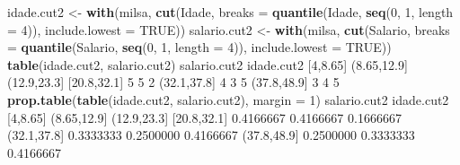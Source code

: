 \documentclass[10pt,a4paper]{book}
\newenvironment{Shaded}{\begin{snugshade}}{\end{snugshade}}
\newcommand{\KeywordTok}[1]{\textcolor[rgb]{0.13,0.29,0.53}{\textbf{#1}}}
\newcommand{\DataTypeTok}[1]{\textcolor[rgb]{0.13,0.29,0.53}{#1}}
\newcommand{\DecValTok}[1]{\textcolor[rgb]{0.00,0.00,0.81}{#1}}
\newcommand{\FloatTok}[1]{\textcolor[rgb]{0.00,0.00,0.81}{#1}}
\newcommand{\StringTok}[1]{\textcolor[rgb]{0.31,0.60,0.02}{#1}}
\newcommand{\OtherTok}[1]{\textcolor[rgb]{0.56,0.35,0.01}{#1}}
\newcommand{\NormalTok}[1]{#1}
\begin{document}
\begin{Shaded}
\begin{Highlighting}[]
\NormalTok{idade.cut2 <-}\StringTok{ }\KeywordTok{with}\NormalTok{(milsa, }\KeywordTok{cut}\NormalTok{(Idade,}
                              \DataTypeTok{breaks =} \KeywordTok{quantile}\NormalTok{(Idade, }\KeywordTok{seq}\NormalTok{(}\DecValTok{0}\NormalTok{, }\DecValTok{1}\NormalTok{, }\DataTypeTok{length =} \DecValTok{4}\NormalTok{)),}
                              \DataTypeTok{include.lowest =} \OtherTok{TRUE}\NormalTok{))}
\NormalTok{salario.cut2 <-}\StringTok{ }\KeywordTok{with}\NormalTok{(milsa, }\KeywordTok{cut}\NormalTok{(Salario,}
                                \DataTypeTok{breaks =} \KeywordTok{quantile}\NormalTok{(Salario, }\KeywordTok{seq}\NormalTok{(}\DecValTok{0}\NormalTok{, }\DecValTok{1}\NormalTok{, }\DataTypeTok{length =} \DecValTok{4}\NormalTok{)),}
                                \DataTypeTok{include.lowest =} \OtherTok{TRUE}\NormalTok{))}
\KeywordTok{table}\NormalTok{(idade.cut2, salario.cut2)}
\NormalTok{             salario.cut2}
\NormalTok{idade.cut2    [}\DecValTok{4}\NormalTok{,}\FloatTok{8.65}\NormalTok{] (}\FloatTok{8.65}\NormalTok{,}\FloatTok{12.9}\NormalTok{] (}\FloatTok{12.9}\NormalTok{,}\FloatTok{23.3}\NormalTok{]}
\NormalTok{  [}\FloatTok{20.8}\NormalTok{,}\FloatTok{32.1}\NormalTok{]        }\DecValTok{5}           \DecValTok{5}           \DecValTok{2}
\NormalTok{  (}\FloatTok{32.1}\NormalTok{,}\FloatTok{37.8}\NormalTok{]        }\DecValTok{4}           \DecValTok{3}           \DecValTok{5}
\NormalTok{  (}\FloatTok{37.8}\NormalTok{,}\FloatTok{48.9}\NormalTok{]        }\DecValTok{3}           \DecValTok{4}           \DecValTok{5}
\KeywordTok{prop.table}\NormalTok{(}\KeywordTok{table}\NormalTok{(idade.cut2, salario.cut2), }\DataTypeTok{margin =} \DecValTok{1}\NormalTok{)}
\NormalTok{             salario.cut2}
\NormalTok{idade.cut2     [}\DecValTok{4}\NormalTok{,}\FloatTok{8.65}\NormalTok{] (}\FloatTok{8.65}\NormalTok{,}\FloatTok{12.9}\NormalTok{] (}\FloatTok{12.9}\NormalTok{,}\FloatTok{23.3}\NormalTok{]}
\NormalTok{  [}\FloatTok{20.8}\NormalTok{,}\FloatTok{32.1}\NormalTok{] }\FloatTok{0.4166667}   \FloatTok{0.4166667}   \FloatTok{0.1666667}
\NormalTok{  (}\FloatTok{32.1}\NormalTok{,}\FloatTok{37.8}\NormalTok{] }\FloatTok{0.3333333}   \FloatTok{0.2500000}   \FloatTok{0.4166667}
\NormalTok{  (}\FloatTok{37.8}\NormalTok{,}\FloatTok{48.9}\NormalTok{] }\FloatTok{0.2500000}   \FloatTok{0.3333333}   \FloatTok{0.4166667}
\end{Highlighting}
\end{Shaded}
\end{document}
